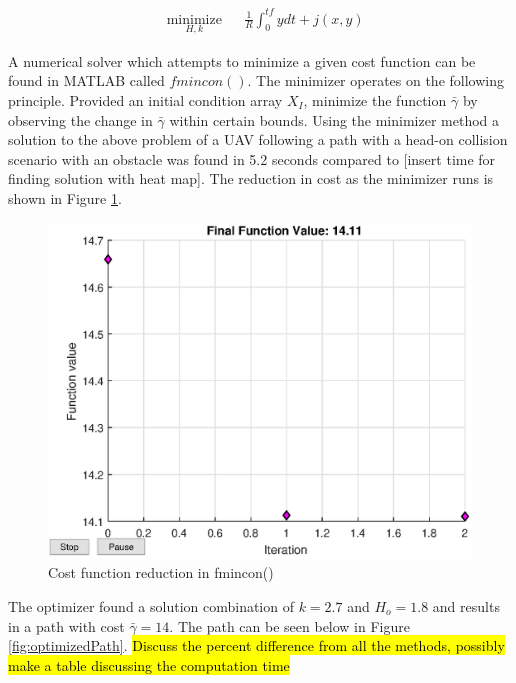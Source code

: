 \documentclass[numbered,pdftex]{ohio-etd}
\begin{document}
\begin{equation}
\label{eq:minimizer}
\begin{aligned}
& \underset{H,k}{\text{minimize}}
& & \frac{1}{R}\int_{0}^{tf}ydt + j(x,y) 
\end{aligned}
\end{equation}

A numerical solver which attempts to minimize a given cost function can be found in MATLAB called $fmincon()$. The minimizer operates on the following principle. Provided an initial condition array $X_I$, minimize the function $\bar{\gamma}$ by observing the change in $\bar{\gamma}$ within certain bounds. Using the minimizer method a solution to the above problem of a UAV following a path with a head-on collision scenario with an obstacle was found in 5.2 seconds compared to [insert time for finding solution with heat map]. The reduction in cost as the minimizer runs is shown in Figure \ref{fig:finalfunctionvalue}.

\begin{figure}[H]
	\centering
	\includegraphics[width=12cm]{PaperFigures/Methods/finalFunctionValue}
	\caption{Cost function reduction in fmincon()}
	\label{fig:finalfunctionvalue}
\end{figure}

The optimizer found a solution combination of $k=2.7$ and $H_o = 1.8$ and results in a path with cost $\bar{\gamma}=14$. The path can be seen below in Figure \ref{fig:optimizedPath}. \hl{Discuss the percent difference from all the methods, possibly make a table discussing the computation time}
\end{document}
